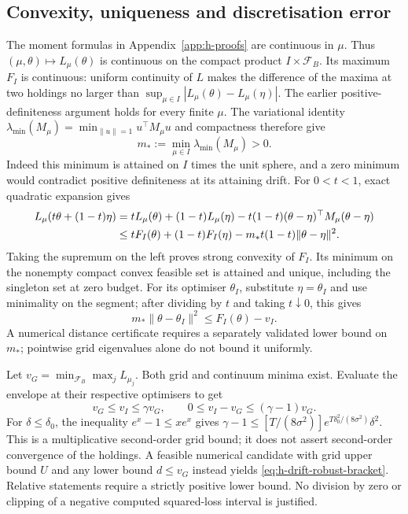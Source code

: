 \documentclass[11pt]{article}
\begin{document}
\subsection{Convexity, uniqueness and discretisation error}

The moment formulas in Appendix~\ref{app:h-proofs} are continuous in $\mu$.
Thus $(\mu,\theta)\mapsto L_\mu(\theta)$ is continuous on the compact product
$I\times\mathcal F_B$. Its maximum $F_I$ is continuous: uniform continuity
of $L$ makes the difference of the maxima at two holdings no larger than
$\sup_{\mu\in I}|L_\mu(\theta)-L_\mu(\eta)|$.
The earlier positive-definiteness argument holds for every finite $\mu$.
The variational identity
$\lambda_{\min}(M_\mu)=\min_{\|u\|=1}u^\top M_\mu u$ and compactness
therefore give
\begin{equation}
 m_*:=\min_{\mu\in I}\lambda_{\min}(M_\mu)>0.
 \label{eq:h-drift-uniform-curvature}
\end{equation}
Indeed this minimum is attained on $I$ times the unit sphere, and a zero
minimum would contradict positive definiteness at its attaining drift.
For $0<t<1$, exact quadratic expansion gives
\begin{align}
 L_\mu(t\theta+(1-t)\eta)
 &=tL_\mu(\theta)+(1-t)L_\mu(\eta)
   -t(1-t)(\theta-\eta)^\top M_\mu(\theta-\eta)\notag\\
 &\leq tF_I(\theta)+(1-t)F_I(\eta)
   -m_*t(1-t)\|\theta-\eta\|^2.
 \label{eq:h-drift-strong-convexity}
\end{align}
Taking the supremum on the left proves strong convexity of $F_I$.
Its minimum on the nonempty compact convex feasible set is attained and
unique, including the singleton set at zero budget. For its optimiser
$\theta_I$, substitute $\eta=\theta_I$ and use minimality on the segment;
after dividing by $t$ and taking $t\downarrow0$, this gives
\begin{equation}
 m_*\|\theta-\theta_I\|^2\leq F_I(\theta)-v_I.
 \label{eq:h-drift-distance}
\end{equation}
A numerical distance certificate requires a separately validated lower
bound on $m_*$; pointwise grid eigenvalues alone do not bound it uniformly.

Let $v_G=\min_{\mathcal F_B}\max_jL_{\mu_j}$. Both grid and continuum
minima exist. Evaluate the envelope at their respective optimisers to get
\begin{equation}
 v_G\leq v_I\leq\gamma v_G,\qquad
 0\leq v_I-v_G\leq(\gamma-1)v_G.
 \label{eq:h-drift-grid-convergence}
\end{equation}
For $\delta\leq\delta_0$, the inequality $e^x-1\leq xe^x$ gives
$\gamma-1\leq[T/(8\sigma^2)]e^{T\delta_0^2/(8\sigma^2)}\delta^2$.
This is a multiplicative second-order grid bound; it does not assert
second-order convergence of the holdings. A feasible numerical candidate
with grid upper bound $U$ and any lower bound $d\leq v_G$ instead yields
\eqref{eq:h-drift-robust-bracket}. Relative statements require a strictly
positive lower bound. No division by zero or clipping of a negative
computed squared-loss interval is justified.
\end{document}
